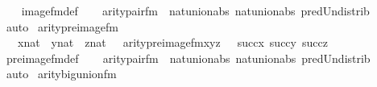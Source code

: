 \begin{isabellebody}
%
\isadelimproof
\ \ %
\endisadelimproof
%
\isatagproof
{}\isamarkupfalse%
\ image{\isacharunderscore}{\kern0pt}fm{\isacharunderscore}{\kern0pt}def\isanewline
\ \ \isamarkupfalse%
\ arity{\isacharunderscore}{\kern0pt}pair{\isacharunderscore}{\kern0pt}fm\ \ nat{\isacharunderscore}{\kern0pt}union{\isacharunderscore}{\kern0pt}abs{}\ nat{\isacharunderscore}{\kern0pt}union{\isacharunderscore}{\kern0pt}abs{}\ pred{\isacharunderscore}{\kern0pt}Un{\isacharunderscore}{\kern0pt}distrib\isanewline
\ \ \isamarkupfalse%
\ auto%
\endisatagproof
{\isafoldproof}%
%
\isadelimproof
\isanewline
%
\endisadelimproof
\isanewline
{}\isamarkupfalse%
\ arity{\isacharunderscore}{\kern0pt}pre{\isacharunderscore}{\kern0pt}image{\isacharunderscore}{\kern0pt}fm\ {\isacharcolon}{\kern0pt}\ \isanewline
\ \ {\isachardoublequoteopen}{\isasymlbrakk}\ x{\isasymin}nat\ {\isacharsemicolon}{\kern0pt}\ y{\isasymin}nat\ {\isacharsemicolon}{\kern0pt}\ z{\isasymin}nat\ {\isasymrbrakk}\ {\isasymLongrightarrow}\ arity{\isacharparenleft}{\kern0pt}pre{\isacharunderscore}{\kern0pt}image{\isacharunderscore}{\kern0pt}fm{\isacharparenleft}{\kern0pt}x{\isacharcomma}{\kern0pt}y{\isacharcomma}{\kern0pt}z{\isacharparenright}{\kern0pt}{\isacharparenright}{\kern0pt}\ {\isacharequal}{\kern0pt}\ {\isasymUnion}\ {\isacharbraceleft}{\kern0pt}succ{\isacharparenleft}{\kern0pt}x{\isacharparenright}{\kern0pt}{\isacharcomma}{\kern0pt}\ succ{\isacharparenleft}{\kern0pt}y{\isacharparenright}{\kern0pt}{\isacharcomma}{\kern0pt}\ succ{\isacharparenleft}{\kern0pt}z{\isacharparenright}{\kern0pt}{\isacharbraceright}{\kern0pt}{\isachardoublequoteclose}\isanewline
%
\isadelimproof
\ \ %
\endisadelimproof
%
\isatagproof
{}\isamarkupfalse%
\ pre{\isacharunderscore}{\kern0pt}image{\isacharunderscore}{\kern0pt}fm{\isacharunderscore}{\kern0pt}def\isanewline
\ \ \isamarkupfalse%
\ arity{\isacharunderscore}{\kern0pt}pair{\isacharunderscore}{\kern0pt}fm\ \ nat{\isacharunderscore}{\kern0pt}union{\isacharunderscore}{\kern0pt}abs{}\ nat{\isacharunderscore}{\kern0pt}union{\isacharunderscore}{\kern0pt}abs{}\ pred{\isacharunderscore}{\kern0pt}Un{\isacharunderscore}{\kern0pt}distrib\isanewline
\ \ \isamarkupfalse%
\ auto%
\endisatagproof
{\isafoldproof}%
%
\isadelimproof
\isanewline
%
\endisadelimproof
\isanewline
\isanewline
{}\isamarkupfalse%
\ arity{\isacharunderscore}{\kern0pt}big{\isacharunderscore}{\kern0pt}union{\isacharunderscore}{\kern0pt}fm\ {\isacharcolon}{\kern0pt}\ \isanewline

\end{isabellebody}
